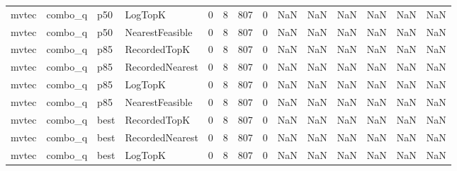 \begin{tabular}{llllrrrrrrrrrr}
   mvtec &              combo\_q &    p50 &         LogTopK &           0 &          8 &            807 &                   0 &            NaN &             NaN &                       NaN &            NaN &                    NaN &                     NaN \\
   mvtec &              combo\_q &    p50 & NearestFeasible &           0 &          8 &            807 &                   0 &            NaN &             NaN &                       NaN &            NaN &                    NaN &                     NaN \\
   mvtec &              combo\_q &    p85 &    RecordedTopK &           0 &          8 &            807 &                   0 &            NaN &             NaN &                       NaN &            NaN &                    NaN &                     NaN \\
   mvtec &              combo\_q &    p85 & RecordedNearest &           0 &          8 &            807 &                   0 &            NaN &             NaN &                       NaN &            NaN &                    NaN &                     NaN \\
   mvtec &              combo\_q &    p85 &         LogTopK &           0 &          8 &            807 &                   0 &            NaN &             NaN &                       NaN &            NaN &                    NaN &                     NaN \\
   mvtec &              combo\_q &    p85 & NearestFeasible &           0 &          8 &            807 &                   0 &            NaN &             NaN &                       NaN &            NaN &                    NaN &                     NaN \\
   mvtec &              combo\_q &   best &    RecordedTopK &           0 &          8 &            807 &                   0 &            NaN &             NaN &                       NaN &            NaN &                    NaN &                     NaN \\
   mvtec &              combo\_q &   best & RecordedNearest &           0 &          8 &            807 &                   0 &            NaN &             NaN &                       NaN &            NaN &                    NaN &                     NaN \\
   mvtec &              combo\_q &   best &         LogTopK &           0 &          8 &            807 &                   0 &            NaN &             NaN &                       NaN &            NaN &                    NaN &                     NaN \\

\end{tabular}
